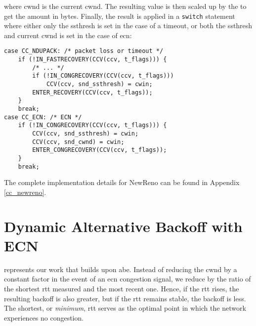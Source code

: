 where cwnd is the current \gls{cwnd}. The resulting value is then scaled up by the  to get the amount in bytes. Finally, the result is applied in a \lstinline{switch} statement where either only the \gls{ssthresh} is set in the case of a timeout, or both the \gls{ssthresh} and current \gls{cwnd} is set in the case of \gls{ecn}:

\begin{verbatim}
case CC_NDUPACK: /* packet loss or timeout */
    if (!IN_FASTRECOVERY(CCV(ccv, t_flags))) {
        /* ... */
        if (!IN_CONGRECOVERY(CCV(ccv, t_flags)))
            CCV(ccv, snd_ssthresh) = cwin;
        ENTER_RECOVERY(CCV(ccv, t_flags));
    }
    break;
case CC_ECN: /* ECN */
    if (!IN_CONGRECOVERY(CCV(ccv, t_flags))) {
        CCV(ccv, snd_ssthresh) = cwin;
        CCV(ccv, snd_cwnd) = cwin;
        ENTER_CONGRECOVERY(CCV(ccv, t_flags));
    }
    break;
\end{verbatim}
The complete implementation details for NewReno can be found in Appendix \ref{cc_newreno}.









\section{Dynamic Alternative Backoff with ECN}

 represents our work that builds upon \gls{abe}. Instead of reducing the \gls{cwnd} by a constant factor in the event of an \gls{ecn} congestion signal, we reduce by the ratio of the shortest \gls{rtt} measured and the most recent one. Hence, if the \gls{rtt} rises, the resulting backoff is also greater, but if the \gls{rtt} remains stable, the backoff is less. The shortest, or \textit{minimum}, \gls{rtt} serves as the optimal point in which the network experiences no congestion.



